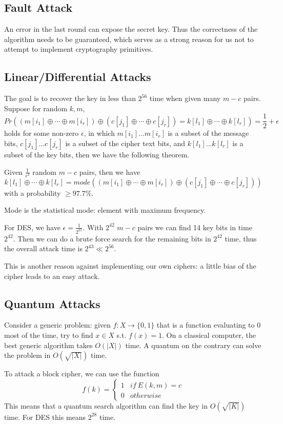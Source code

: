 \subsection{Fault Attack}
An error in the last round can expose the secret key. Thus the correctness of the algorithm needs to be guaranteed, which serves as a strong reason for us not to attempt to implement cryptography primitives.
\subsection{Linear/Differential Attacks}
The goal is to recover the key in less than $2^{56}$ time when given many $m-c$ pairs. Suppose for random $k,m$, 
\[Pr((m[i_1]\oplus\cdots\oplus m[i_r])\oplus(c[j_1]\oplus\cdots\oplus c[j_r]) = k[l_1]\oplus\cdots\oplus k[l_r])=\frac{1}{2}+\epsilon\]
holds for some non-zero $\epsilon$, in which $m[i_1]\dots m[i_r]$ is a subset of the message bits, $c[j_1]\dots c[j_r]$ is a subset of the cipher text bits, and $k[l_1]\dots k[l_r]$ is a subset of the key bits, then we have the following theorem.
\begin{theorem}
Given $\frac{1}{\epsilon^2}$ random $m-c$ pairs, then we have
\[k[l_1]\oplus\cdots\oplus k[l_r]=mode((m[i_1]\oplus\cdots\oplus m[i_r])\oplus(c[j_1]\oplus\cdots\oplus c[j_r]))\]
with a probability $\geq 97.7\%$.
\end{theorem}
Mode is the statistical mode: element with maximum frequency. 

For DES, we have $\epsilon=\frac{1}{2^{21}}$. With $2^{42}$ $m-c$ pairs we can find 14 key bits in time $2^{42}$. Then we can do a brute force search for the remaining bits in $2^{42}$ time, thus the overall attack time is $2^{43}\ll 2^{56}$. 

This is another reason against implementing our own ciphers: a little bias of the cipher leads to an easy attack.
\subsection{Quantum Attacks}
Consider a generic problem: given $f:X\rightarrow\{0,1\}$ that is a function evaluating to 0 most of the time, try to find $x\in X$ s.t. $f(x)=1$. On a classical computer, the best generic algorithm takes $O(\lvert X\rvert)$ time. A quantum on the contrary can solve the problem in $O(\sqrt{\lvert X\rvert})$ time.

To attack a block cipher, we can use the function
\begin{equation*}
f(k)=\begin{cases}
1&if\:E(k,m)=c\\
0&otherwise
\end{cases}\end{equation*}
This means that a quantum search algorithm can find the key in $O(\sqrt{\lvert K\rvert})$ time. For DES this means $2^{28}$ time. 
\ifx\PREAMBLE\undefined

\fi